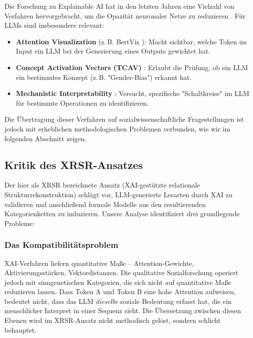\documentclass[12pt,a4paper]{article}
\begin{document}
Die Forschung zu Explainable AI hat in den letzten Jahren eine Vielzahl von Verfahren hervorgebracht, um die Opazität neuronaler Netze zu reduzieren \cite{guidotti2018survey}. Für LLMs sind insbesondere relevant:

\begin{itemize}
    \item \textbf{Attention Visualization} (z. B. BertViz \cite{vig2019visualizing}): Macht sichtbar, welche Token im Input ein LLM bei der Generierung eines Outputs gewichtet hat.
    \item \textbf{Concept Activation Vectors (TCAV)} \cite{kim2018interpretability}: Erlaubt die Prüfung, ob ein LLM ein bestimmtes Konzept (z. B. "Gender-Bias") erkannt hat.
    \item \textbf{Mechanistic Interpretability} \cite{elhage2021mathematical}: Versucht, spezifische "Schaltkreise" im LLM für bestimmte Operationen zu identifizieren.
\end{itemize}

Die Übertragung dieser Verfahren auf sozialwissenschaftliche Fragestellungen ist jedoch mit erheblichen methodologischen Problemen verbunden, wie wir im folgenden Abschnitt zeigen.

\subsection{Kritik des XRSR-Ansatzes}

Der hier als XRSR bezeichnete Ansatz (XAI-gestützte relationale Strukturrekonstruktion) schlägt vor, LLM-generierte Lesarten durch XAI zu validieren und anschließend formale Modelle aus den resultierenden Kategorienketten zu induzieren. Unsere Analyse identifiziert drei grundlegende Probleme:

\subsubsection{Das Kompatibilitätsproblem}

XAI-Verfahren liefern quantitative Maße – Attention-Gewichte, Aktivierungsstärken, Vektordistanzen. Die qualitative Sozialforschung operiert jedoch mit sinngenetischen Kategorien, die sich nicht auf quantitative Maße reduzieren lassen. Dass Token A und Token B eine hohe Attention aufweisen, bedeutet nicht, dass das LLM \textit{dieselbe} soziale Bedeutung erfasst hat, die ein menschlicher Interpret in einer Sequenz sieht. Die Übersetzung zwischen diesen Ebenen wird im XRSR-Ansatz nicht methodisch gelöst, sondern schlicht behauptet.
\end{document}
